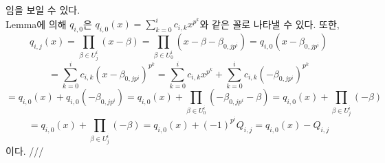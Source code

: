 \documentclass[11pt]{article}
\begin{document}
임을 보일 수 있다.\\
Lemma에 의해 $q_{i,0}$은 $q_{i,0}(x)=\sum_{k=0}^{i}c_{i,k}x^{p^{k}}$와 같은 꼴로 나타낼 수 있다. 또한,
\begin{displaymath}
q_{i,j}(x)=\prod_{\beta\in U_{j}^{i}}(x-\beta)=\prod_{\beta\in U_{0}^{i}}(x-\beta-\beta_{0,jp^{i}})=q_{i,0}(x-\beta_{0,jp^{i}})
\end{displaymath}
\begin{displaymath}
=\sum_{k=0}^{i}c_{i,k}(x-\beta_{0,jp^{i}})^{p^{k}}=\sum_{k=0}^{i}c_{i,k}x^{p^{k}}+\sum_{k=0}^{i}c_{i,k}(-\beta_{0,jp^{i}})^{p^{k}}
\end{displaymath}
\begin{displaymath}
=q_{i,0}(x)+q_{i,0}(-\beta_{0,jp^{i}})=q_{i,0}(x)+\prod_{\beta\in U_{0}^{i}}(-\beta_{0,jp^{i}}-\beta)=q_{i,0}(x)+\prod_{\beta\in U_{j}^{i}}(-\beta)
\end{displaymath}
\begin{displaymath}
=q_{i,0}(x)+\prod_{\beta\in U_{j}^{i}}(-\beta)=q_{i,0}(x)+(-1)^{p^{i}}Q_{i,j}=q_{i,0}(x)-Q_{i,j}
\end{displaymath}
이다.  ///
\end{document}
